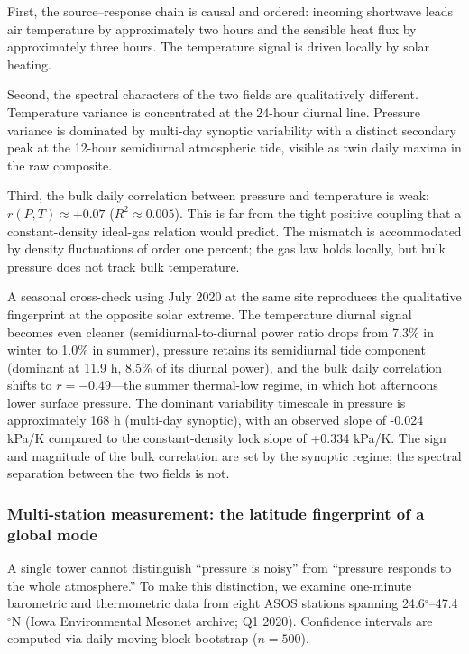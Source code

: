 \documentclass[aps,prfluids,preprint,superscriptaddress,nofootinbib]{revtex4-2}
\begin{document}
First, the source--response chain is causal and ordered: incoming shortwave leads air temperature by approximately two hours and the sensible heat flux by approximately three hours. The temperature signal is driven locally by solar heating.

Second, the spectral characters of the two fields are qualitatively different. Temperature variance is concentrated at the 24-hour diurnal line. Pressure variance is dominated by multi-day synoptic variability with a distinct secondary peak at the 12-hour semidiurnal atmospheric tide, visible as twin daily maxima in the raw composite.

Third, the bulk daily correlation between pressure and temperature is weak: $r(P,T)\approx +0.07$ ($R^{2}\approx 0.005$). This is far from the tight positive coupling that a constant-density ideal-gas relation would predict. The mismatch is accommodated by density fluctuations of order one percent; the gas law holds locally, but bulk pressure does not track bulk temperature.

A seasonal cross-check using July 2020 at the same site reproduces the qualitative fingerprint at the opposite solar extreme. The temperature diurnal signal becomes even cleaner (semidiurnal-to-diurnal power ratio drops from 7.3\% in winter to 1.0\% in summer), pressure retains its semidiurnal tide component (dominant at 11.9 h, 8.5\% of its diurnal power), and the bulk daily correlation shifts to $r=-0.49$---the summer thermal-low regime, in which hot afternoons lower surface pressure. The dominant variability timescale in pressure is approximately 168 h (multi-day synoptic), with an observed slope of -0.024 kPa/K compared to the constant-density lock slope of +0.334 kPa/K. The sign and magnitude of the bulk correlation are set by the synoptic regime; the spectral separation between the two fields is not.

\subsubsection{Multi-station measurement: the latitude fingerprint of a global mode}
\label{sec:asos}

A single tower cannot distinguish ``pressure is noisy'' from ``pressure responds to the whole atmosphere.'' To make this distinction, we examine one-minute barometric and thermometric data from eight ASOS stations spanning 24.6$^\circ$--47.4$^\circ$N (Iowa Environmental Mesonet archive; Q1 2020). Confidence intervals are computed via daily moving-block bootstrap ($n = 500$).
\end{document}
